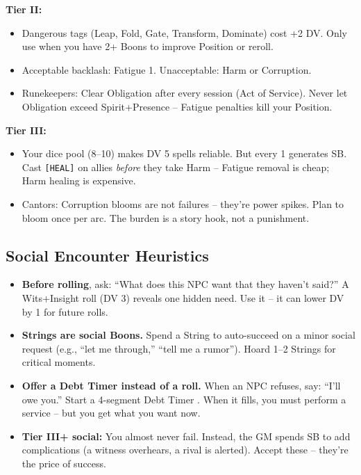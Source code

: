 \documentclass[11pt]{article}
\begin{document}
\textbf{Tier II:}
\begin{itemize}
    \item Dangerous tags (Leap, Fold, Gate, Transform, Dominate) cost +2 DV. Only use when you have 2+ Boons to improve Position or reroll.
    \item Acceptable backlash: Fatigue 1. Unacceptable: Harm or Corruption.
    \item Runekeepers: Clear Obligation after every session (Act of Service). Never let Obligation exceed Spirit+Presence -- Fatigue penalties kill your Position.
\end{itemize}

\textbf{Tier III:}
\begin{itemize}
    \item Your dice pool (8--10) makes DV 5 spells reliable. But every 1 generates SB. Cast \texttt{[HEAL]} on allies \textit{before} they take Harm -- Fatigue removal is cheap; Harm healing is expensive.
    \item Cantors: Corruption blooms are not failures -- they're power spikes. Plan to bloom once per arc. The burden is a story hook, not a punishment.
\end{itemize}

\subsection*{Social Encounter Heuristics}

\begin{itemize}
    \item \textbf{Before rolling}, ask: ``What does this NPC want that they haven't said?'' A Wits+Insight roll (DV 3) reveals one hidden need. Use it -- it can lower DV by 1 for future rolls.
    \item \textbf{Strings are social Boons.} Spend a String to auto-succeed on a minor social request (e.g., ``let me through,'' ``tell me a rumor''). Hoard 1--2 Strings for critical moments.
    \item \textbf{Offer a Debt Timer instead of a roll.} When an NPC refuses, say: ``I'll owe you.'' Start a 4-segment Debt Timer . When it fills, you must perform a service -- but you get what you want now.
    \item \textbf{Tier III+ social:} You almost never fail. Instead, the GM spends SB to add complications (a witness overhears, a rival is alerted). Accept these -- they're the price of success.
\end{itemize}
\end{document}
